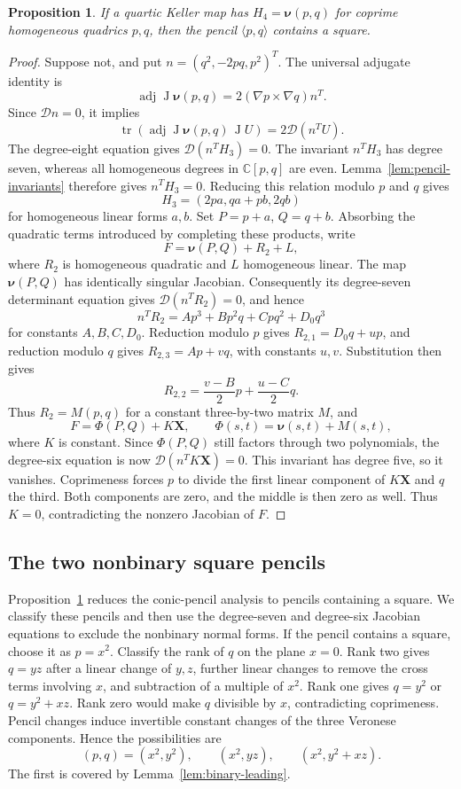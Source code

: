 \documentclass[11pt,reqno]{amsart}
\numberwithin{equation}{section}
\theoremstyle{plain}
\newtheorem{proposition}[theorem]{Proposition}
\theoremstyle{definition}
\theoremstyle{remark}
\newcommand{\C}{\mathbb C}
\newcommand{\tr}{\operatorname{tr}}
\newcommand{\adj}{\operatorname{adj}}
\newcommand{\J}{\operatorname J}
\newcommand{\nuu}{\boldsymbol\nu}
\newcommand{\XX}{\boldsymbol X}
\newcommand{\calD}{\mathcal D}
\begin{document}
\begin{proposition}\label{prop:square-forced}
If a quartic Keller map has $H_4=\nuu(p,q)$ for coprime homogeneous quadrics $p,q$, then the pencil $\langle p,q\rangle$ contains a square.
\end{proposition}
\begin{proof}
Suppose not, and put $n=(q^2,-2pq,p^2)^T$. The universal adjugate identity is
\begin{equation}\label{eq:veronese-adj}
\adj\J\nuu(p,q)=2(\nabla p\times\nabla q)n^T.
\end{equation}
Since $\calD n=0$, it implies
\[
\tr(\adj\J\nuu(p,q)\,\J U)=2\calD(n^TU).
\]
The degree-eight equation gives $\calD(n^TH_3)=0$. The invariant $n^TH_3$ has degree seven, whereas all homogeneous degrees in $\C[p,q]$ are even. Lemma~\ref{lem:pencil-invariants} therefore gives $n^TH_3=0$. Reducing this relation modulo $p$ and $q$ gives
\[
H_3=(2pa,qa+pb,2qb)
\]
for homogeneous linear forms $a,b$. Set $P=p+a$, $Q=q+b$. Absorbing the quadratic terms introduced by completing these products, write
\[
F=\nuu(P,Q)+R_2+L,
\]
where $R_2$ is homogeneous quadratic and $L$ homogeneous linear. The map $\nuu(P,Q)$ has identically singular Jacobian. Consequently its degree-seven determinant equation gives $\calD(n^TR_2)=0$, and hence
\[
n^TR_2=A p^3+B p^2q+C pq^2+D_0q^3
\]
for constants $A,B,C,D_0$.
Reduction modulo $p$ gives $R_{2,1}=D_0q+up$, and reduction modulo $q$ gives $R_{2,3}=Ap+vq$, with constants $u,v$. Substitution then gives
\[
R_{2,2}=\frac{v-B}{2}p+\frac{u-C}{2}q.
\]
Thus $R_2=M(p,q)$ for a constant three-by-two matrix $M$, and
\[
F=\Phi(P,Q)+K\XX,\qquad
\Phi(s,t)=\nuu(s,t)+M(s,t),
\]
where $K$ is constant. Since $\Phi(P,Q)$ still factors through two polynomials, the degree-six equation is now $\calD(n^TK\XX)=0$. This invariant has degree five, so it vanishes. Coprimeness forces $p$ to divide the first linear component of $K\XX$ and $q$ the third. Both components are zero, and the middle is then zero as well. Thus $K=0$, contradicting the nonzero Jacobian of $F$.
\end{proof}

\subsection{The two nonbinary square pencils}\label{sec:square}
Proposition~\ref{prop:square-forced} reduces the conic-pencil analysis to
pencils containing a square. We classify these pencils and then use the
degree-seven and degree-six Jacobian equations to exclude the nonbinary
normal forms.
If the pencil contains a square, choose it as $p=x^2$. Classify the rank of $q$ on the plane $x=0$. Rank two gives $q=yz$ after a linear change of $y,z$, further linear changes to remove the cross terms involving $x$, and subtraction of a multiple of $x^2$. Rank one gives $q=y^2$ or $q=y^2+xz$. Rank zero would make $q$ divisible by $x$, contradicting coprimeness. Pencil changes induce invertible constant changes of the three Veronese components. Hence the possibilities are
\begin{equation}\label{eq:square-normalforms}
(p,q)=(x^2,y^2),\qquad(x^2,yz),\qquad(x^2,y^2+xz).
\end{equation}
The first is covered by Lemma~\ref{lem:binary-leading}.
\end{document}
